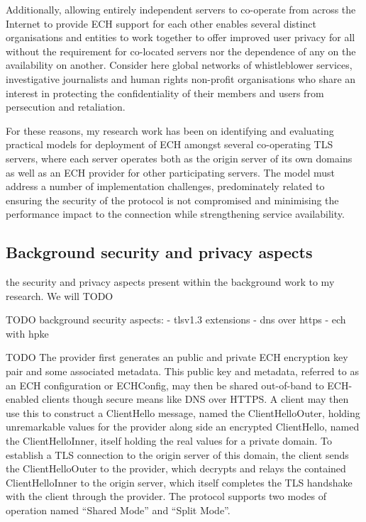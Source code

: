 \documentclass[a4paper,oneside,12pt]{article}
\begin{document}
Additionally, allowing entirely independent servers to co-operate from across the Internet to provide ECH support for each other enables several distinct organisations and entities to work together to offer improved user privacy for all without the requirement for co-located servers nor the dependence of any on the availability on another. Consider here global networks of whistleblower services, investigative journalists and human rights non-profit organisations who share an interest in protecting the confidentiality of their members and users from persecution and retaliation.

For these reasons, my research work has been on identifying and evaluating practical models for deployment of ECH amongst several co-operating TLS servers, where each server operates both as the origin server of its own domains as well as an ECH provider for other participating servers. The model must address a number of implementation challenges, predominately related to ensuring the security of the protocol is not compromised and minimising the performance impact to the connection while strengthening service availability.

\subsection*{Background security and privacy aspects}

the security and privacy aspects present within the background work to my research. We will TODO

TODO
background security aspects:
- tlsv1.3 extensions
- dns over https
- ech with hpke


TODO The provider first generates an public and private ECH encryption key pair and some associated metadata. This public key and metadata, referred to as an ECH configuration or ECHConfig, may then be shared out-of-band to ECH-enabled clients though secure means like DNS over HTTPS. A client may then use this to construct a ClientHello message, named the ClientHelloOuter, holding unremarkable values for the provider along side an encrypted ClientHello, named the ClientHelloInner, itself holding the real values for a private domain. To establish a TLS connection to the origin server of this domain, the client sends the ClientHelloOuter to the provider, which decrypts and relays the contained ClientHelloInner to the origin server, which itself completes the TLS handshake with the client through the provider.
The protocol supports two modes of operation named ``Shared Mode'' and ``Split Mode''.
\end{document}
